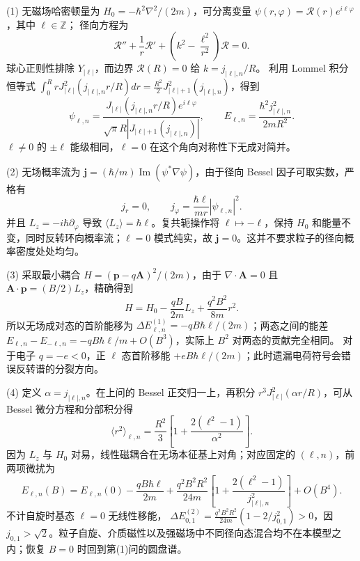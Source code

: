 (1) 无磁场哈密顿量为
\(H_0=-\hbar^2\nabla^2/(2m)\)，可分离变量
\(\psi(r,\varphi)=\mathcal R(r)e^{i\ell\varphi}\)，其中 \(\ell\in\mathbb Z\)；
径向方程为
\[
\mathcal R''+\frac1r\mathcal R'+\left(k^2-\frac{\ell^2}{r^2}\right)\mathcal R=0.
\]
球心正则性排除 \(Y_{|\ell|}\)，而边界 \(\mathcal R(R)=0\) 给 \(k=j_{|\ell|,n}/R\)。
利用 Lommel 积分恒等式
\(\int_0^R rJ_{|\ell|}^2(j_{|\ell|,n}r/R)dr=\frac{R^2}{2}J_{|\ell|+1}^2(j_{|\ell|,n})\)，得到
\[
\psi_{\ell,n}=
\frac{J_{|\ell|}(j_{|\ell|,n}r/R)e^{i\ell\varphi}}
{\sqrt\pi R|J_{|\ell|+1}(j_{|\ell|,n})|},\qquad
E_{\ell,n}=\frac{\hbar^2j_{|\ell|,n}^2}{2mR^2}.
\]
\(\ell\ne0\) 的 \(\pm\ell\) 能级相同，\(\ell=0\) 在这个角向对称性下无成对简并。

(2) 无场概率流为
\(\mathbf j=(\hbar/m)\operatorname{Im}(\psi^*\nabla\psi)\)，由于径向 Bessel 因子可取实数，严格有
\[
j_r=0,\qquad j_\varphi=\frac{\hbar\ell}{mr}|\psi_{\ell,n}|^2.
\]
并且 \(L_z=-i\hbar\partial_\varphi\) 导致
\(\langle L_z\rangle=\hbar\ell\)。复共轭操作将 \(\ell\mapsto-\ell\)，保持
\(H_0\) 和能量不变，同时反转环向概率流；\(\ell=0\) 模式纯实，故
\(\mathbf j=0\)。这并不要求粒子的径向概率密度处处均匀。

(3) 采取最小耦合 \(H=(\mathbf p-q\mathbf A)^2/(2m)\)，由于
\(\nabla\cdot\mathbf A=0\) 且 \(\mathbf A\cdot\mathbf p=(B/2)L_z\)，精确得到
\[
H=H_0-\frac{qB}{2m}L_z+\frac{q^2B^2}{8m}r^2.
\]
所以无场成对态的首阶能移为
\(\Delta E_{\ell,n}^{(1)}=-qB\hbar\ell/(2m)\)；两态之间的能差
\(E_{\ell,n}-E_{-\ell,n}=-qB\hbar\ell/m+O(B^3)\)，实际上 \(B^2\) 对两态的贡献完全相同。
对于电子 \(q=-e<0\)，正 \(\ell\) 态首阶移能 \(+eB\hbar\ell/(2m)\)；此时遗漏电荷符号会错误反转谱的分裂方向。

(4) 定义 \(\alpha=j_{|\ell|,n}\)。在上问的 Bessel 正交归一上，再积分
\(r^3J_{|\ell|}^2(\alpha r/R)\)，可从 Bessel 微分方程和分部积分得
\[
\langle r^2\rangle_{\ell,n}
=\frac{R^2}{3}\left[1+\frac{2(\ell^2-1)}{\alpha^2}\right].
\]
因为 \(L_z\) 与 \(H_0\) 对易，线性磁耦合在无场本征基上对角；对应固定的
\((\ell,n)\)，前两项微扰为
\[
E_{\ell,n}(B)=E_{\ell,n}(0)
-\frac{qB\hbar\ell}{2m}
+\frac{q^2B^2R^2}{24m}
\left[1+\frac{2(\ell^2-1)}{j_{|\ell|,n}^2}\right]
+O(B^4).
\]
不计自旋时基态 \(\ell=0\) 无线性移能，
\(\Delta E_{0,1}^{(2)}=\frac{q^2B^2R^2}{24m}
(1-2/j_{0,1}^2)>0\)，因 \(j_{0,1}> \sqrt2\)。粒子自旋、介质磁性以及强磁场中不同径向态混合均不在本模型之内；恢复 \(B=0\) 时回到第(1)问的圆盘谱。
